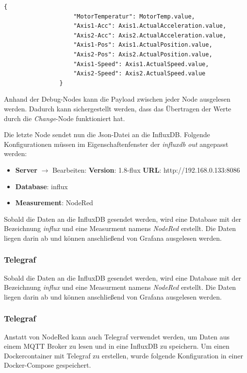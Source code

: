 \documentclass[a4paper, 12pt, oneside, toc=listofnumbered, bibliography=totoc]{scrbook}
\begin{document}
			\begin{lstlisting}[numbers=none, frame=single]
				{
					"MotorTemperatur": MotorTemp.value,
					"Axis1-Acc": Axis1.ActualAcceleration.value,
					"Axis2-Acc": Axis2.ActualAcceleration.value,
					"Axis1-Pos": Axis1.ActualPosition.value,
					"Axis2-Pos": Axis2.ActualPosition.value,
					"Axis1-Speed": Axis1.ActualSpeed.value,
					"Axis2-Speed": Axis2.ActualSpeed.value
				}
			\end{lstlisting}
		
			Anhand der Debug-Nodes kann die Payload zwischen jeder Node ausgelesen werden. Dadurch kann sichergestellt werden, dass das Übertragen der Werte durch die \textit{Change}-Node funktioniert hat. 
			
			Die letzte Node sendet nun die Json-Datei an die InfluxDB. Folgende Konfigurationen müssen im Eigenschaftenfenster der \textit{influxdb out} angepasst werden:
			
			\begin{itemize}
				\item \textbf{Server} $\rightarrow$ Bearbeiten:
				\subitem \textbf{Version}: 1.8-flux
				\subitem \textbf{URL}: http://192.168.0.133:8086
				\item \textbf{Database}: influx
				\item \textbf{Measurement}: NodeRed
			\end{itemize}
			
			Sobald die Daten an die InfluxDB gesendet werden, wird eine Database mit der Bezeichnung \textit{influx} und eine Measurment namens \textit{NodeRed} erstellt. Die Daten liegen darin ab und können anschließend von Grafana ausgelesen werden.
			
			\subsubsection{Telegraf}
		
				Sobald die Daten an die InfluxDB gesendet werden, wird eine Database mit der Bezeichnung \textit{influx} und eine Measurment namens \textit{NodeRed} erstellt. Die Daten liegen darin ab und können anschließend von Grafana ausgelesen werden.
			
			\subsubsection{Telegraf}
			
			Anstatt von NodeRed kann auch Telegraf verwendet werden, um Daten aus einem MQTT Broker zu lesen und in eine InfluxDB zu speichern. Um einen Dockercontainer mit Telegraf zu erstellen, wurde folgende Konfiguration in einer Docker-Compose gespeichert.
			
\end{document}

